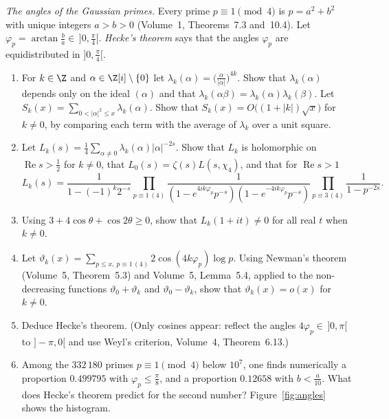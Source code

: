 \begin{exercise}[Journey]\label{pb:hecke}
\emph{The angles of the Gaussian primes.} Every prime $p\equiv1\pmod4$ is $p=a^2+b^2$ with unique integers $a>b>0$ (Volume~1, Theorems~7.3 and~10.4). Let
$\varphi_p=\arctan\frac ba\in\,]0,\frac\pi4[$. \emph{Hecke's theorem} says that the angles $\varphi_p$ are equidistributed in $]0,\frac\pi4[$.
\begin{enumerate}[label=(\alph*)]
\item For $k\in\Z$ and $\alpha\in\Z[i]\setminus\{0\}$ let $\lambda_k(\alpha)=\bigl(\frac\alpha{|\alpha|}\bigr)^{4k}$. Show that $\lambda_k(\alpha)$ depends only on the ideal
$(\alpha)$ and that $\lambda_k(\alpha\beta)=\lambda_k(\alpha)\lambda_k(\beta)$. Let $S_k(x)=\sum_{0<|\alpha|^2\le x}\lambda_k(\alpha)$. Show that $S_k(x)=O\bigl((1+|k|)\sqrt x\bigr)$
for $k\ne0$, by comparing each term with the average of $\lambda_k$ over a unit square.
\item Let $L_k(s)=\frac14\sum_{\alpha\ne0}\lambda_k(\alpha)|\alpha|^{-2s}$. Show that $L_k$ is holomorphic on $\operatorname{Re}s>\frac12$ for $k\ne0$, that
$L_0(s)=\zeta(s)L(s,\chi_4)$, and that for $\operatorname{Re}s>1$
\[
L_k(s)=\frac1{1-(-1)^k2^{-s}}\prod_{p\equiv1\,(4)}\frac1{(1-e^{4ik\varphi_p}p^{-s})(1-e^{-4ik\varphi_p}p^{-s})}\prod_{p\equiv3\,(4)}\frac1{1-p^{-2s}}.
\]
\item Using $3+4\cos\theta+\cos2\theta\ge0$, show that $L_k(1+it)\ne0$ for all real $t$ when $k\ne0$.
\item Let $\vartheta_k(x)=\sum_{p\le x,\ p\equiv1\,(4)}2\cos(4k\varphi_p)\log p$. Using Newman's theorem (Volume~5, Theorem~5.3) and Volume~5, Lemma~5.4, applied to the
non-decreasing functions $\vartheta_0+\vartheta_k$ and $\vartheta_0-\vartheta_k$, show that $\vartheta_k(x)=o(x)$ for $k\ne0$.
\item Deduce Hecke's theorem. (Only cosines appear: reflect the angles $4\varphi_p\in\,]0,\pi[$ to $]-\pi,0[$ and use Weyl's criterion, Volume~4, Theorem~6.13.)
\item Among the $332\,180$ primes $p\equiv1\pmod4$ below $10^7$, one finds numerically a proportion $0.499795$ with $\varphi_p\le\frac\pi8$, and a proportion $0.12658$
with $b<\frac a{10}$. What does Hecke's theorem predict for the second number? Figure~\ref{fig:angles} shows the histogram.
\end{enumerate}
\end{exercise}

